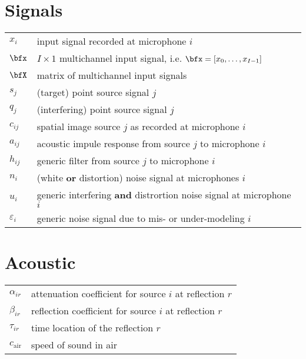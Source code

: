 \section*{Signals}
\begin{table}[H]
    \begin{tabular}{ll}
        $x_i$     & input signal recorded at microphone $i$\\
        $\bfx$    & $I \times 1$ multichannel input signal, i.e. $\bfx = [x_0, \dots, x_{I-1}]$ \\
        $\bfX$    & matrix of multichannel input signals\\
        $s_j$     & (target) point source signal $j$ \\
        $q_j$     & (interfering) point source signal $j$ \\
        $c_{ij}$    & spatial image source $j$ as recorded at microphone $i$\\
        $a_{ij}$  & acoustic impule response from source $j$ to microphone $i$ \\
        $h_{ij}$  & generic filter from source $j$ to microphone $i$ \\
        $n_{i}$   & (white \textbf{or} distortion) noise signal at microphones $i$\\
        $u_{i}$   & generic interfering \textbf{and} distrortion noise signal at microphone $i$ \\
        $\varepsilon_{i}$   & generic noise signal due to mis- or under-modeling $i$ \\
    \end{tabular}
\end{table}

\section*{Acoustic}
\begin{table}[H]
    \begin{tabular}{ll}
        $\alpha_{ir}$   & attenuation coefficient for source $i$ at reflection $r$\\
        $\beta_{ir}$    & reflection coefficient for source $i$ at reflection $r$\\
        $\tau_{ir}$     & time location of the reflection $r$\\
        $c_\text{air}$  & speed of sound in air\\
    \end{tabular}
\end{table}

